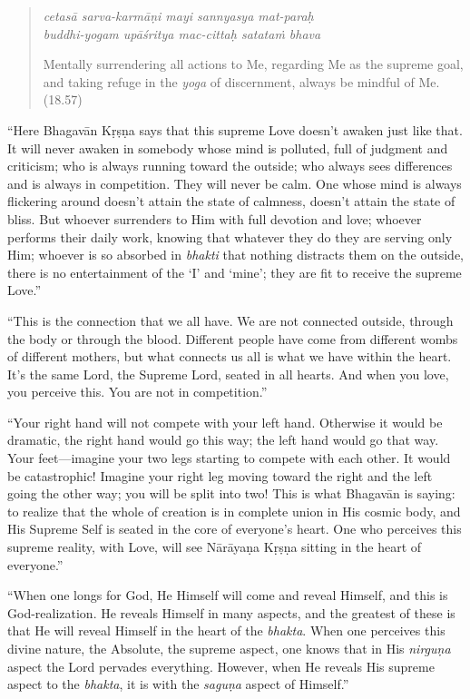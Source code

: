 \documentclass[12pt, twoside, openright]{memoir}
\begin{document}
\par
\begin{verse}
\textit{cetasā sarva-karmāṇi mayi sannyasya mat-paraḥ} \\
\textit{buddhi-yogam upāśritya mac-cittaḥ satataṁ bhava}

\noindent Mentally surrendering all actions to Me, regarding Me as the supreme goal, and taking refuge in the \textit{yoga} of discernment, always be mindful of Me. (18.57)
\end{verse}
\par


\enquote{Here Bhagavān Kṛṣṇa says that this supreme Love doesn’t awaken just like that. It will never awaken in somebody whose mind is polluted, full of judgment and criticism; who is always running toward the outside; who always sees differences and is always in competition. They will never be calm. One whose mind is always flickering around doesn’t attain the state of calmness, doesn’t attain the state of bliss. But whoever surrenders to Him with full devotion and love; whoever performs their daily work, knowing that whatever they do they are serving only Him; whoever is so absorbed in \textit{bhakti} that nothing distracts them on the outside, there is no entertainment of the \enquote{I} and \enquote{mine}; they are fit to receive the supreme Love.}

\enquote{This is the connection that we all have. We are not connected outside, through the body or through the blood. Different people have come from different wombs of different mothers, but what connects us all is what we have within the heart. It’s the same Lord, the Supreme Lord, seated in all hearts. And when you love, you perceive this. You are not in competition.}

\enquote{Your right hand will not compete with your left hand. Otherwise it would be dramatic, the right hand would go this way; the left hand would go that way. Your feet---imagine your two legs starting to compete with each other. It would be catastrophic! Imagine your right leg moving toward the right and the left going the other way; you will be split into two! This is what Bhagavān is saying: to realize that the whole of creation is in complete union in His cosmic body, and His Supreme Self is seated in the core of everyone’s heart. One who perceives this supreme reality, with Love, will see Nārāyaṇa Kṛṣṇa sitting in the heart of everyone.}

\enquote{When one longs for God, He Himself will come and reveal Himself, and this is God-realization. He reveals Himself in many aspects, and the greatest of these is that He will reveal Himself in the heart of the \textit{bhakta}. When one perceives this divine nature, the Absolute, the supreme aspect, one knows that in His \textit{nirguṇa} aspect the Lord pervades everything. However, when He reveals His supreme aspect to the \textit{bhakta}, it is with the \textit{saguṇa} aspect of Himself.}
\end{document}
